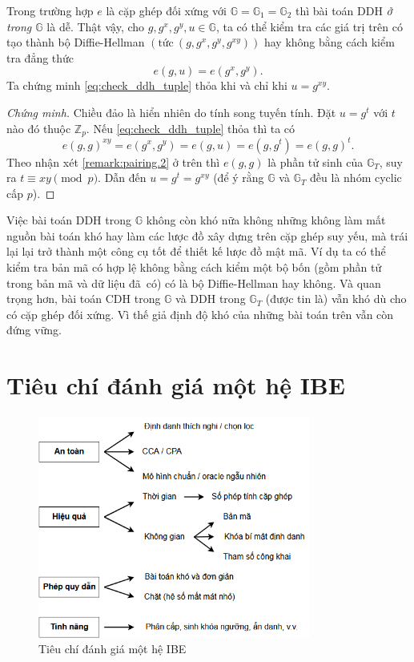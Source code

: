 \documentclass[class=report, crop=false]{standalone}
\begin{document}
			\begin{remark}
				Trong trường hợp $e$ là cặp ghép đối xứng với $\mathbb{G} = \mathbb{G}_1 = \mathbb{G}_2$ thì bài toán DDH \emph{ở trong $\mathbb{G}$} là dễ. Thật vậy, cho $g, g^x, g^y, u \in \mathbb{G}$, ta có thể kiểm tra các giá trị trên có tạo thành bộ Diffie-Hellman $(\text{tức}\ (g, g^x, g^y, g^{xy}))$ hay không bằng cách kiểm tra đẳng thức
				\begin{equation}
					e(g, u) = e(g^x, g^y). \tag{*}\label{eq:check_ddh_tuple}
				\end{equation} \indent
				Ta chứng minh \eqref{eq:check_ddh_tuple} thỏa khi và chỉ khi $u = g^{xy}$.
				\vspace{-\baselineskip}
				\begin{proof}[Chứng minh]
					Chiều đảo là hiển nhiên do tính song tuyến tính. Đặt $u = g^t$ với $t$ nào đó thuộc $\mathbb{Z}_p$. Nếu \eqref{eq:check_ddh_tuple} thỏa thì ta có
					\[
						e(g, g)^{xy} = e(g^x, g^y) = e(g, u) = e(g, g^t) = e(g, g)^t.
					\]
					Theo nhận xét \ref{remark:pairing.2} ở trên thì $e(g, g)$ là phần tử sinh của $\mathbb{G}_T$, suy ra $t \equiv xy \pmod{p}$. Dẫn đến $u = g^t = g^{xy}$ (để ý rằng $\mathbb{G}$ và $\mathbb{G}_T$ đều là nhóm cyclic cấp $p$).
				\end{proof}
				\vspace{-\baselineskip}
				Việc bài toán DDH trong $\mathbb{G}$ không còn khó nữa không những không làm mất nguồn bài toán khó hay làm các lược đồ xây dựng trên cặp ghép suy yếu, mà trái lại lại trở thành một công cụ tốt để thiết kế lược đồ mật mã. Ví dụ ta có thể kiểm tra bản mã có hợp lệ không bằng cách kiểm một bộ bốn (gồm phần tử trong bản mã và dữ liệu đã~có) có là bộ Diffie-Hellman hay không. Và quan trọng hơn, bài toán CDH trong $\mathbb{G}$ và DDH trong $\mathbb{G}_T$ (được tin là) vẫn khó dù cho có cặp ghép đối xứng. Vì thế giả định độ khó của những bài toán trên vẫn còn đứng vững.
			\end{remark}
	\section{Tiêu chí đánh giá một hệ IBE}
		\begin{figure}[h] 
			\captionsetup{font=normalsize}
			\includegraphics[width=0.8\textwidth]{ibe_criteria.png}
			\centering
			\caption{Tiêu chí đánh giá một hệ IBE}
		\end{figure}
\end{document}
